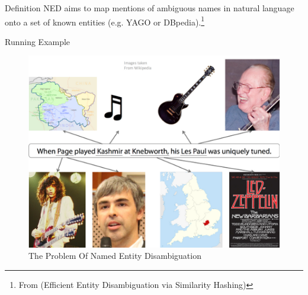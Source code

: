 \begin{frame}

 \begin{center}
 \Huge  \color{blue}{Named Entity Disambiguation}
  
  \bigskip

  \end{center}
\begin{exampleblock}{Definition}
  NED aims to map mentions of ambiguous names in natural language 
onto a set of known entities (e.g. YAGO or DBpedia).\footnote{From (Efficient Entity Disambiguation via
Similarity Hashing)}
\end{exampleblock}

\end{frame}

\begin{frame}{Running Example}
 \begin{figure}[h]
 \centering
 \includegraphics[bb=0 0 216 165]{./ned.png}
 \caption{The Problem Of Named Entity Disambiguation}
\end{figure}

\end{frame}

